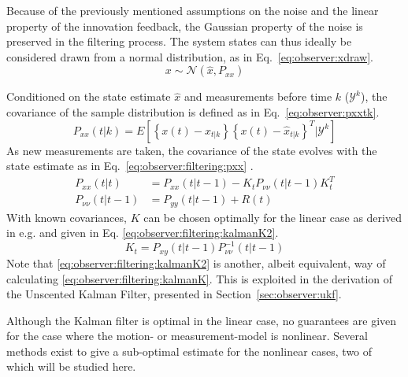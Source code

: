     Because of the previously mentioned assumptions on the noise and the linear property
    of the innovation feedback, the Gaussian property of the noise is preserved
    in the filtering process. The system states can thus ideally
    be considered drawn from a normal distribution, as in Eq.~\eqref{eq:observer:xdraw}.
    \begin{equation}
        \label{eq:observer:xdraw}
        x \sim \mathcal{N}\left(\hat{x}, P_{xx}\right)
    \end{equation}

    Conditioned on the state estimate $\hat{x}$ and measurements before time $k$ ($\mathcal{Y}^{k}$), the
    covariance of the sample distribution is defined as in Eq.~\ref{eq:observer:pxxtk}.
    \begin{equation}
        \label{eq:observer:pxxtk}
        P_{xx}(t|k) = E \left[ \left\lbrace x(t) - \hat{x}_{t|k} \right\rbrace
                               \left\lbrace x(t) - \hat{x}_{t|k} \right\rbrace^{T}
                               | \mathcal{Y}^{k} \right]
    \end{equation}
    As new measurements are taken, the covariance of the state evolves
    with the state estimate as in Eq.~\eqref{eq:observer:filtering:pxx} \citep{Julier95anewapproach}.
    \begin{align}
        P_{xx}(t|t) &= P_{xx}(t|t-1) - K_{t}P_{\nu\nu}(t|t-1)K_{t}^{T} \label{eq:observer:filtering:pxx} \\
        P_{\nu\nu}(t|t-1) &= P_{yy}(t|t-1) + R(t) \label{eq:observer:filtering:pnunu}
    \end{align}
    With known covariances, $K$ can be chosen optimally for the linear case as derived in e.g. \citep{gustafsson2010statistical}
    and given in Eq. \eqref{eq:observer:filtering:kalmanK2}.
    \begin{equation}
        \label{eq:observer:filtering:kalmanK2}
        K_{t} = P_{xy}(t|t-1)P_{\nu\nu}^{-1}(t|t-1)
    \end{equation}
    Note that \eqref{eq:observer:filtering:kalmanK2} is another, albeit equivalent,
    way of calculating \eqref{eq:observer:filtering:kalmanK}. This is exploited
    in the derivation of the Unscented Kalman Filter, presented in Section~\ref{sec:observer:ukf}.

    Although the Kalman filter is optimal in the linear case, no guarantees
    are given for the case where the motion- or measurement-model is nonlinear.
    Several methods exist to give a sub-optimal estimate for the nonlinear cases,
    two of which will be studied here.

